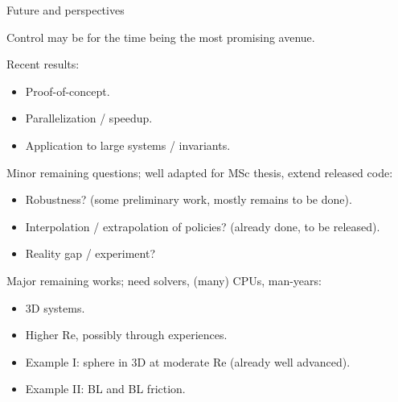 \documentclass{beamer}
\begin{document}
\begin{frame}{Future and perspectives}

Control may be for the time being the most promising avenue.

Recent results:

\begin{itemize}
    \item Proof-of-concept.
    \item Parallelization / speedup.
    \item Application to large systems / invariants.
\end{itemize}

Minor remaining questions; well adapted for MSc thesis, extend released code:

\begin{itemize}
    \item Robustness? (some preliminary work, mostly remains to be done).
    \item Interpolation / extrapolation of policies? (already done, to be released).
    \item Reality gap / experiment?
\end{itemize}

Major remaining works; need solvers, (many) CPUs, man-years:

\begin{itemize}
    \item 3D systems.
    \item Higher Re, possibly through experiences.
    \item Example I: sphere in 3D at moderate Re (already well advanced).
    \item Example II: BL and BL friction.
\end{itemize}

\end{frame}
\end{document}
